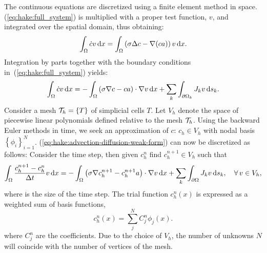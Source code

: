 The continuous equations are discretized using a finite element method
in space. (\ref{eq:hake:full_system}) is multiplied with a proper
test function, $v$, and integrated over the spatial domain, thus
obtaining:
\begin{equation}
  \label{eq:hake:advection-diffusion-weak-form-0}
  \int_\Omega\dot{c}v \, \mathrm{d}x = \int_\Omega \left(\sigma\Delta c-\nabla(ca)\right) v \, \mathrm{d}x.
\end{equation}
Integration by parts together with the boundary conditions
in~(\ref{eq:hake:full_system}) yields:
\begin{equation}
  \label{eq:hake:advection-diffusion-weak-form}
  \int_\Omega\dot{c}v \, \mathrm{d}x = -\int_\Omega \left(\sigma\nabla c-ca\right)\cdot\nabla v \, \mathrm{d}x + \sum_k\int_{\partial\Omega_k} J_kv \, \mathrm{d}s{}_k.
\end{equation}
Consider a mesh $\mathcal{T}_h = \left\{T\right\}$ of simplicial cells
$T$. Let $V_h$ denote the space of piecewise linear polynomials
defined relative to the mesh $\mathcal{T}_h$. Using the backward Euler methods in
time, we seek an approximation of $c$: $c_h\in V_h$ with nodal basis
$\left\{\phi_i\right\}^N_{i=1}$. (\ref{eq:hake:advection-diffusion-weak-form})
can now be discretized as follows: Consider the \nth time step, then
given $c_h^n$ find $c_h^{n+1} \in V_h$ such that
\begin{equation}
  \label{eq:hake:advection-diffusion-weak-discrete-form}
  \int_{\Omega} \frac{c_h^{n+1}-c_h^{n}}{\Delta{}t}v \, \mathrm{d}x = -\int_{\Omega} \left(\sigma\nabla c_h^{n+1}-c_h^{n+1}a\right)\cdot\nabla v \, \mathrm{d}x + \sum_k\int_{\partial\Omega} J_kv\, \mathrm{d}s_{k},\quad\forall\, v \in V_h,
\end{equation}
where \Dt is the size of the time step. The trial function $c^n_h(x)$
is expressed as a weighted sum of basis functions,
\begin{equation}
  \label{eq:hake:discrete-solution}
  c^n_h(x) = \sum^N_j C_j^n\phi_j(x).
\end{equation}
where $C_j^n$ are the coefficients. Due to the choice of $V_h$, the
number of unknowns $N$ will coincide with the number of vertices of
the mesh.


